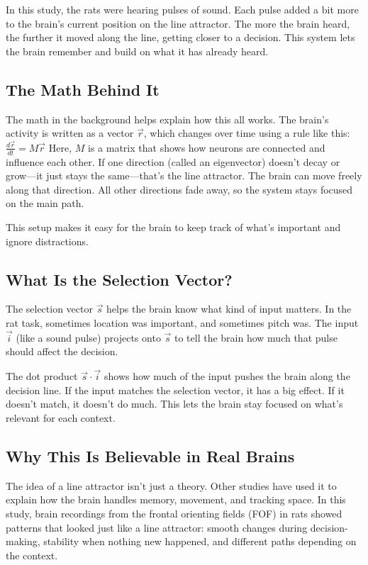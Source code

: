 \documentclass{article}
\begin{document}
In this study, the rats were hearing pulses of sound. Each pulse added a bit more to the brain’s current position on the line attractor. The more the brain heard, the further it moved along the line, getting closer to a decision. This system lets the brain remember and build on what it has already heard.

\subsection{The Math Behind It}
The math in the background helps explain how this all works. The brain’s activity is written as a vector $\vec{r}$, which changes over time using a rule like this:
$\frac{d\vec{r}}{dt} = M\vec{r}$
Here, $M$ is a matrix that shows how neurons are connected and influence each other. If one direction (called an eigenvector) doesn’t decay or grow—it just stays the same—that's the line attractor. The brain can move freely along that direction. All other directions fade away, so the system stays focused on the main path.

This setup makes it easy for the brain to keep track of what's important and ignore distractions.

\subsection{What Is the Selection Vector?}
The selection vector $\vec{s}$ helps the brain know what kind of input matters. In the rat task, sometimes location was important, and sometimes pitch was. The input $\vec{i}$ (like a sound pulse) projects onto $\vec{s}$ to tell the brain how much that pulse should affect the decision.

The dot product $\vec{s} \cdot \vec{i}$ shows how much of the input pushes the brain along the decision line. If the input matches the selection vector, it has a big effect. If it doesn’t match, it doesn’t do much. This lets the brain stay focused on what’s relevant for each context.

\subsection{Why This Is Believable in Real Brains}
The idea of a line attractor isn’t just a theory. Other studies have used it to explain how the brain handles memory, movement, and tracking space. In this study, brain recordings from the frontal orienting fields (FOF) in rats showed patterns that looked just like a line attractor: smooth changes during decision-making, stability when nothing new happened, and different paths depending on the context.
\end{document}
